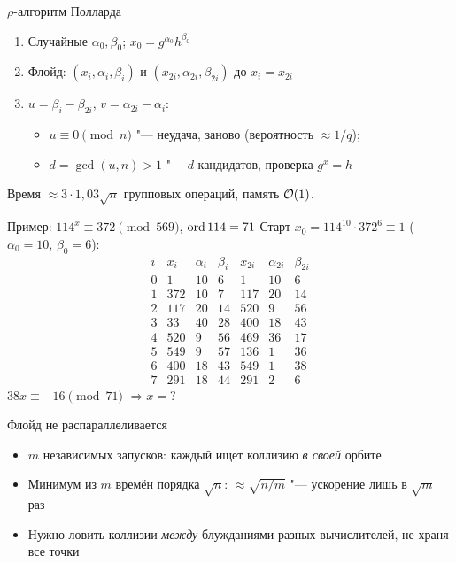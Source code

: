 \documentclass{ca-slides}
\begin{document}
\begin{canvasframe}{$\rho$-алгоритм Полларда}
  \begin{enumerate}
    \item Случайные $\alpha_0, \beta_0$; $x_0 = g^{\alpha_0}h^{\beta_0}$
    \item Флойд: $(x_i, \alpha_i, \beta_i)$ и $(x_{2i}, \alpha_{2i}, \beta_{2i})$ до
      $x_i = x_{2i}$
    \item $u = \beta_i - \beta_{2i}$, $v = \alpha_{2i} - \alpha_i$:
      \begin{itemize}
        \item $u \equiv 0 \pmod n$ "--- неудача, заново (вероятность $\approx 1/q$);
        \item $d = \gcd(u, n) > 1$ "--- $d$ кандидатов, проверка $g^x = h$
      \end{itemize}
  \end{enumerate}
  \begin{theorem}[эвристическая]
    Время $\approx 3 \cdot 1{,}03\sqrt n$ групповых операций, память $\mathcal{O}(1)$.
  \end{theorem}
\end{canvasframe}

\begin{canvasframe}[shrink=8]{Пример: $114^x \equiv 372 \pmod{569}$, $\operatorname{ord} 114 = 71$}
  \small
  Старт $x_0 = 114^{10} \cdot 372^{6} \equiv 1$ ($\alpha_0 = 10$, $\beta_0 = 6$):
  \[
  \begin{array}{r|rrr|rrr}
    i & x_i & \alpha_i & \beta_i & x_{2i} & \alpha_{2i} & \beta_{2i} \\ \hline
    0 & 1 & 10 & 6 & 1 & 10 & 6 \\
    1 & 372 & 10 & 7 & 117 & 20 & 14 \\
    2 & 117 & 20 & 14 & 520 & 9 & 56 \\
    3 & 33 & 40 & 28 & 400 & 18 & 43 \\
    4 & 520 & 9 & 56 & 469 & 36 & 17 \\
    5 & 549 & 9 & 57 & 136 & 1 & 36 \\
    6 & 400 & 18 & 43 & 549 & 1 & 38 \\
    7 & 291 & 18 & 44 & 291 & 2 & 6
  \end{array}
  \]
  $38x \equiv -16 \pmod{71}$ \quad$\Rightarrow$\quad $x = ?$
  \penspace[0.1\textheight]
\end{canvasframe}

\begin{canvasframe}{Флойд не распараллеливается}
  \begin{itemize}
    \item $m$ независимых запусков: каждый ищет коллизию \emph{в своей} орбите
    \item Минимум из $m$ времён порядка $\sqrt n$: $\approx \sqrt{n/m}$ "--- ускорение
      лишь в $\sqrt m$ раз
    \item Нужно ловить коллизии \emph{между} блужданиями разных вычислителей,
      не храня все точки
  \end{itemize}
  \penspace
\end{canvasframe}
\end{document}
